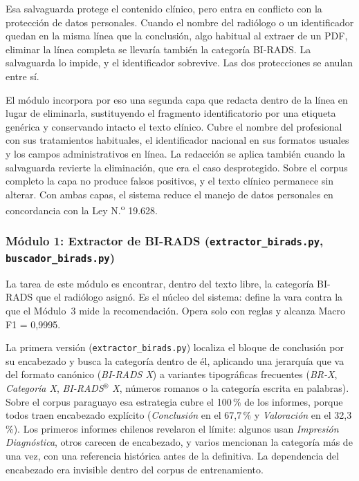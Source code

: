 \documentclass[10pt,journal,a4paper]{IEEEtran}
\newcommand{\codename}[1]{\texttt{#1}}
\begin{document}
Esa salvaguarda protege el contenido cl\'inico, pero entra en conflicto con la protecci\'on de datos personales. Cuando el nombre del radi\'ologo o un identificador quedan en la misma l\'inea que la conclusi\'on, algo habitual al extraer de un PDF, eliminar la l\'inea completa se llevar\'ia tambi\'en la categor\'ia BI-RADS. La salvaguarda lo impide, y el identificador sobrevive. Las dos protecciones se anulan entre s\'i.

El m\'odulo incorpora por eso una segunda capa que redacta dentro de la l\'inea en lugar de eliminarla, sustituyendo el fragmento identificatorio por una etiqueta gen\'erica y conservando intacto el texto cl\'inico. Cubre el nombre del profesional con sus tratamientos habituales, el identificador nacional en sus formatos usuales y los campos administrativos en l\'inea. La redacci\'on se aplica tambi\'en cuando la salvaguarda revierte la eliminaci\'on, que era el caso desprotegido. Sobre el corpus completo la capa no produce falsos positivos, y el texto cl\'inico permanece sin alterar. Con ambas capas, el sistema reduce el manejo de datos personales en concordancia con la Ley N.\textsuperscript{o} 19.628.

\subsubsection{M\'odulo 1: Extractor de BI-RADS (\codename{extractor\_birads.py}, \codename{buscador\_birads.py})}
La tarea de este m\'odulo es encontrar, dentro del texto libre, la categor\'ia BI-RADS que el radi\'ologo asign\'o. Es el n\'ucleo del sistema: define la vara contra la que el M\'odulo~3 mide la recomendaci\'on. Opera solo con reglas y alcanza Macro F1 = 0,9995.

La primera versi\'on (\codename{extractor\_birads.py}) localiza el bloque de conclusi\'on por su encabezado y busca la categor\'ia dentro de \'el, aplicando una jerarqu\'ia que va del formato can\'onico (\emph{BI-RADS X}) a variantes tipogr\'aficas frecuentes (\emph{BR-X}, \emph{Categor\'ia X}, \emph{BI-RADS$^\circledR$ X}, n\'umeros romanos o la categor\'ia escrita en palabras). Sobre el corpus paraguayo esa estrategia cubre el 100\,\% de los informes, porque todos traen encabezado expl\'icito (\emph{Conclusi\'on} en el 67,7\,\% y \emph{Valoraci\'on} en el 32,3\,\%). Los primeros informes chilenos revelaron el l\'imite: algunos usan \emph{Impresi\'on Diagn\'ostica}, otros carecen de encabezado, y varios mencionan la categor\'ia m\'as de una vez, con una referencia hist\'orica antes de la definitiva. La dependencia del encabezado era invisible dentro del corpus de entrenamiento.
\end{document}
